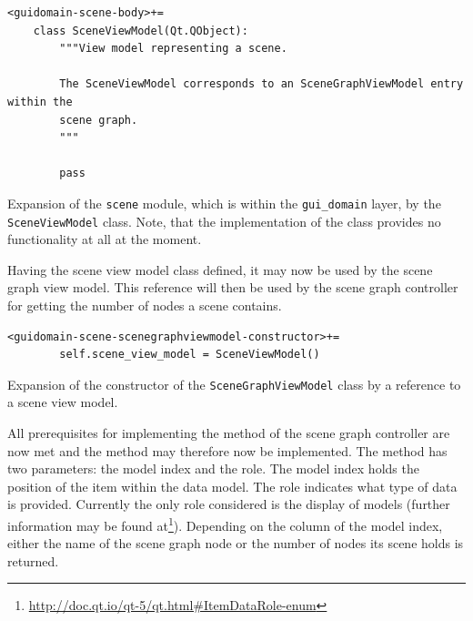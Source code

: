 \documentclass[10pt, openright, notitlepage]{scrreprt}
\newcommand{\myverb}{\collectverb{\fcolorbox{black!50}{black!25}}}
\begin{document}
\begin{listing}[H]
\begin{verbatim}
<guidomain-scene-body>+=
    class SceneViewModel(Qt.QObject):
        """View model representing a scene.
    
        The SceneViewModel corresponds to an SceneGraphViewModel entry within the
        scene graph.
        """
    
        pass
\end{verbatim}
\caption{\label{lst:guidomain-scene-sceneviewmodel}
Expansion of the \texttt{scene} module, which is within the \texttt{gui\_domain} layer, by the \texttt{SceneViewModel} class. Note, that the implementation of the class provides no functionality at all at the moment.}
\end{listing}

Having the scene view model class defined, it may now be used by the scene graph
view model. This reference will then be used by the scene graph controller for
getting the number of nodes a scene contains.

\begin{listing}[H]
\begin{verbatim}
<guidomain-scene-scenegraphviewmodel-constructor>+=
        self.scene_view_model = SceneViewModel()
\end{verbatim}
\caption{\label{lst:guidomain-scene-scenegraphviewmodel-constructor-01}
Expansion of the constructor of the \texttt{SceneGraphViewModel} class by a reference to a scene view model.}
\end{listing}

All prerequisites for implementing the \myverb{data} method of the scene
graph controller are now met and the method may therefore now be implemented.
The method has two parameters: the model index and the role. The model index
holds the position of the item within the data model. The role indicates what
type of data is provided. Currently the only role considered is the display of
models (further information may be found
at\footnote{\url{http://doc.qt.io/qt-5/qt.html\#ItemDataRole-enum}}).
Depending on the column of the model index, either the name of the scene graph
node or the number of nodes its scene holds is returned.
\end{document}
